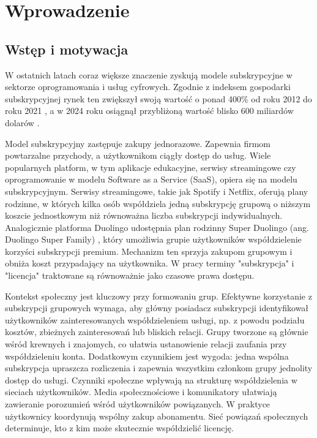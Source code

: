 \chapter{Wprowadzenie}\label{chap:introduction}
\section{Wstęp i motywacja}
W ostatnich latach coraz większe znaczenie zyskują modele subskrypcyjne w sektorze oprogramowania i usług cyfrowych. Zgodnie z indeksem gospodarki subskrypcyjnej rynek ten zwiększył swoją wartość o ponad 400\% od roku 2012 do roku 2021 \cite{subscriptionEconomyIndex}, a w 2024 roku osiągnął przybliżoną wartość blisko 600 miliardów dolarów \cite{subscriptionEconomyPrice2024}.

Model subskrypcyjny zastępuje zakupy jednorazowe. Zapewnia firmom powtarzalne przychody, a użytkownikom ciągły dostęp do usług. Wiele popularnych platform, w tym aplikacje edukacyjne, serwisy streamingowe czy oprogramowanie w modelu Software as a Service (SaaS), opiera się na modelu subskrypcyjnym. Serwisy streamingowe, takie jak Spotify i Netflix, oferują plany rodzinne, w których kilka osób współdziela jedną subskrypcję grupową o niższym koszcie jednostkowym niż równoważna liczba subskrypcji indywidualnych. Analogicznie platforma Duolingo udostępnia plan rodzinny Super Duolingo (ang. Duolingo Super Family) \cite{duolingo_family}, który umożliwia grupie użytkowników współdzielenie korzyści subskrypcji premium. Mechanizm ten sprzyja zakupom grupowym i obniża koszt przypadający na użytkownika. W pracy terminy "subskrypcja" i "licencja" traktowane są równoważnie jako czasowe prawa dostępu.

Kontekst społeczny jest kluczowy przy formowaniu grup. Efektywne korzystanie z subskrypcji grupowych wymaga, aby główny posiadacz subskrypcji identyfikował użytkowników zainteresowanych współdzieleniem usługi, np. z powodu podziału kosztów, zbieżnych zainteresowań lub bliskich relacji. Grupy tworzone są głównie wśród krewnych i znajomych, co ułatwia ustanowienie relacji zaufania przy współdzieleniu konta. Dodatkowym czynnikiem jest wygoda: jedna wspólna subskrypcja upraszcza rozliczenia i zapewnia wszystkim członkom grupy jednolity dostęp do usługi. Czynniki społeczne wpływają na strukturę współdzielenia w sieciach użytkowników. Media społecznościowe i komunikatory ułatwiają zawieranie porozumień wśród użytkowników powiązanych. W praktyce użytkownicy koordynują wspólny zakup abonamentu. Sieć powiązań społecznych determinuje, kto z kim może skutecznie współdzielić licencję.

